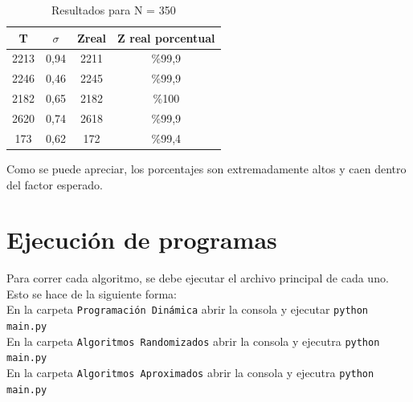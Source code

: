 \documentclass[a4paper, 10pt]{article}
\def\code#1{\texttt{#1}}
\newcommand\tab[1][0.5cm]{\hspace*{#1}}
\begin{document}
                \begin{table}[h!]
                    \centering
                    \caption{Resultados para N = 350}


                    \begin{tabular}{c|c|c|c}
                        T & $\sigma$ & Zreal & Z real porcentual \\
                        \hline
                        2213 & 0,94 & 2211 & \%99,9 \\
                        \hline
                        2246 & 0,46 & 2245 & \%99,9 \\
                        \hline
                        2182 & 0,65 & 2182 & \%100 \\
                        \hline
                        2620 & 0,74 & 2618 & \%99,9 \\
                        \hline
                        173 & 0,62 & 172 & \%99,4 \\
                    \end{tabular}
                \end{table}

                \tab Como se puede apreciar, los porcentajes son extremadamente altos y caen dentro del factor esperado.
    \newpage

    \section{Ejecución de programas}
    \tab Para correr cada algoritmo, se debe ejecutar el archivo principal de cada uno.
    Esto se hace de la siguiente forma: \\
    \tab\tab En la carpeta \code{Programación Dinámica} abrir la consola y ejecutar \code{python main.py} \\
    \tab\tab En la carpeta \code{Algoritmos Randomizados} abrir la consola y ejecutra \code{python main.py} \\
    \tab\tab En la carpeta \code{Algoritmos Aproximados} abrir la consola y ejecutra \code{python main.py} \\

\end{document}
